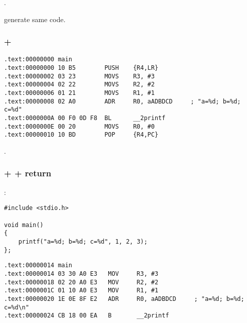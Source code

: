 .

\OptimizingKeilVI generate same code.

\subsubsection{\OptimizingKeilVI + \ThumbMode}

\begin{lstlisting}[caption=\OptimizingKeilVI + \ThumbMode]
.text:00000000 main
.text:00000000 10 B5        PUSH    {R4,LR}
.text:00000002 03 23        MOVS    R3, #3
.text:00000004 02 22        MOVS    R2, #2
.text:00000006 01 21        MOVS    R1, #1
.text:00000008 02 A0        ADR     R0, aADBDCD     ; "a=%d; b=%d; c=%d"
.text:0000000A 00 F0 0D F8  BL      __2printf
.text:0000000E 00 20        MOVS    R0, #0
.text:00000010 10 BD        POP     {R4,PC}
\end{lstlisting}

.

\subsubsection{\OptimizingKeilVI + \ARMMode +  return}
\label{ARM_B_to_printf}

 :

\begin{lstlisting}
#include <stdio.h>

void main()
{
	printf("a=%d; b=%d; c=%d", 1, 2, 3);
};
\end{lstlisting}


\begin{lstlisting}[caption=\OptimizingKeilVI + \ARMMode]
.text:00000014 main
.text:00000014 03 30 A0 E3   MOV     R3, #3
.text:00000018 02 20 A0 E3   MOV     R2, #2
.text:0000001C 01 10 A0 E3   MOV     R1, #1
.text:00000020 1E 0E 8F E2   ADR     R0, aADBDCD     ; "a=%d; b=%d; c=%d\n"
.text:00000024 CB 18 00 EA   B       __2printf
\end{lstlisting}

